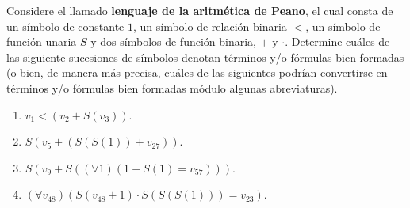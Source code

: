 \documentclass[12pt]{report}
\newcounter{it}
\theoremstyle{largebreak}
\begin{document}
    \begin{sol}
    \end{sol}

    \begin{excer}
        Considere el llamado \textbf{lenguaje de la aritmética de Peano}, el cual consta de un símbolo de constante $1$, un símbolo de relación binaria $<$, un símbolo de función unaria $S$ y dos símbolos de función binaria, $+$ y $\cdot$. Determine cuáles de las siguiente sucesiones de símbolos denotan términos y/o fórmulas bien formadas (o bien, de manera más precisa, cuáles de las siguientes podrían convertirse en términos y/o fórmulas bien formadas módulo algunas abreviaturas).
        \begin{enumerate}[label=($\alph*$)]
            \item $v_1<(v_2+S(v_3))$.
            \item $S(v_5+(S(S(1))+v_27))$.
            \item $S(v_9+S((\forall 1)(1+S(1)=v_{57})))$.
            \item $(\forall v_{48})(S(v_{48}+1)\cdot S(S(S(1)))=v_{23})$.
        \end{enumerate}
    \end{excer}

    \begin{sol}
    \end{sol}
\end{document}
